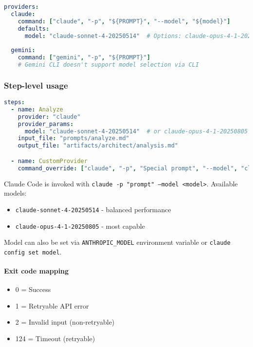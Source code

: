 \documentclass[11pt,a4paper]{article}
\begin{document}
\begin{lstlisting}[language=yaml, caption={Provider Configuration}]
providers:
  claude:
    command: ["claude", "-p", "${PROMPT}", "--model", "${model}"]
    defaults:
      model: "claude-sonnet-4-20250514"  # Options: claude-opus-4-1-20250805
  
  gemini:
    command: ["gemini", "-p", "${PROMPT}"]
    # Gemini CLI doesn't support model selection via CLI
\end{lstlisting}

\subsubsection{Step-level usage}

\begin{lstlisting}[language=yaml, caption={Step-level Provider Usage}]
steps:
  - name: Analyze
    provider: "claude"
    provider_params:
      model: "claude-sonnet-4-20250514"  # or claude-opus-4-1-20250805 for more capability
    input_file: "prompts/analyze.md"
    output_file: "artifacts/architect/analysis.md"

  - name: CustomProvider
    command_override: ["claude", "-p", "Special prompt", "--model", "claude-opus-4-1-20250805"]
\end{lstlisting}

Claude Code is invoked with \texttt{claude -p "prompt" --model <model>}. Available models:
\begin{itemize}
    \item \texttt{claude-sonnet-4-20250514} - balanced performance
    \item \texttt{claude-opus-4-1-20250805} - most capable
\end{itemize}

Model can also be set via \texttt{ANTHROPIC\_MODEL} environment variable or \texttt{claude config set model}.

\paragraph{Exit code mapping}
\begin{itemize}
    \item 0 = Success
    \item 1 = Retryable API error
    \item 2 = Invalid input (non-retryable)
    \item 124 = Timeout (retryable)
\end{itemize}
\end{document}
